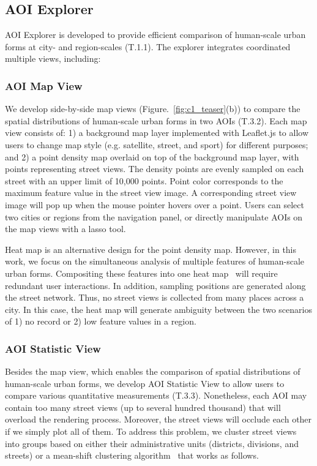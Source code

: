 \subsection{AOI Explorer}
\label{ssec:c1_aoi_explorer}
AOI Explorer is developed to provide efficient comparison of human-scale urban forms at city- and region-scales (T.1.1).
The explorer integrates coordinated multiple views, including:

\subsubsection{AOI Map View}
\label{sssec:c1_aoi_map_view}

We develop side-by-side map views (Figure.~\ref{fig:c1_teaser}(b)) to compare the spatial distributions of human-scale urban forms in two AOIs (T.3.2).
Each map view consists of:
1) a background map layer implemented with Leaflet.js to allow users to change map style (e.g. satellite, street, and sport) for different purposes;
and 2) a point density map overlaid on top of the background map layer, with points representing street views.
The density points are evenly sampled on each street with an upper limit of 10,000 points.
Point color corresponds to the maximum feature value in the street view image.
A corresponding street view image will pop up when the mouse pointer hovers over a point.
Users can select two cities or regions from the navigation panel, or directly manipulate AOIs on the map views with a lasso tool.

Heat map is an alternative design for the point density map.
However, in this work, we focus on the simultaneous analysis of multiple features of human-scale urban forms.
Compositing these features into one heat map~\cite{comaniciu2002mean} will require redundant user interactions.
In addition, sampling positions are generated along the street network.
Thus, no street views is collected from many places across a city.
In this case, the heat map will generate ambiguity between the two scenarios of 1) no record or 2) low feature values in a region.



\subsubsection{AOI Statistic View}
\label{sssec:c1_statistic_view}

Besides the map view, which enables the comparison of spatial distributions of human-scale urban forms, we develop AOI Statistic View to allow users to compare various quantitative measurements (T.3.3).
Nonetheless, each AOI may contain too many street views (up to several hundred thousand) that will overload the rendering process.
Moreover, the street views will occlude each other if we simply plot all of them.
To address this problem, we cluster street views into groups based on either their administrative units (districts, divisions, and streets) or a mean-shift clustering algorithm~\cite{comaniciu_2002_meanshift} that works as follows.


